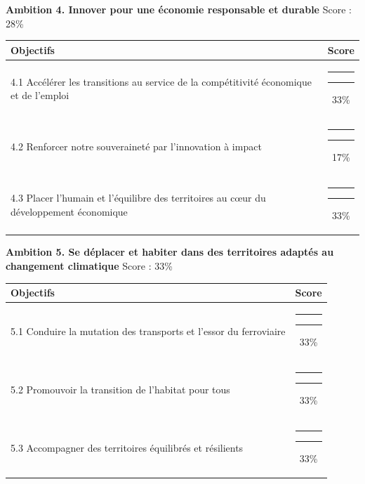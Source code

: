 \documentclass[
]{article}
\begin{document}
\needspace{8cm}
\vspace{0.8cm}

\textbf{\fontsize{10pt}{12pt}\selectfont Ambition 4. Innover pour une économie responsable et durable}
\hfill \small Score : 28\%

\begin{center}
\begin{tabular}{p{10cm}c}
\toprule
Objectifs & Score \\
\midrule
4.1 Accélérer les transitions au service de la compétitivité économique et de l’emploi & {\color[HTML]{EB6E26}\rule{1.98cm}{3pt}}{\color{gray}\rule{4.02cm}{3pt}}\hspace{0.3cm}33\% \\
4.2 Renforcer notre souveraineté par l’innovation à impact & {\color[HTML]{CC1414}\rule{1.02cm}{3pt}}{\color{gray}\rule{4.98cm}{3pt}}\hspace{0.3cm}17\% \\
4.3 Placer l’humain et l’équilibre des territoires au cœur du développement économique & {\color[HTML]{EB6E26}\rule{1.98cm}{3pt}}{\color{gray}\rule{4.02cm}{3pt}}\hspace{0.3cm}33\% \\
\bottomrule
\end{tabular}
\end{center}

\needspace{8cm}
\vspace{0.8cm}

\textbf{\fontsize{10pt}{12pt}\selectfont Ambition 5. Se déplacer et habiter dans des territoires adaptés au changement climatique}
\hfill \small Score : 33\%

\begin{center}
\begin{tabular}{p{10cm}c}
\toprule
Objectifs & Score \\
\midrule
5.1 Conduire la mutation des transports et l’essor du ferroviaire & {\color[HTML]{EB6E26}\rule{1.98cm}{3pt}}{\color{gray}\rule{4.02cm}{3pt}}\hspace{0.3cm}33\% \\
5.2 Promouvoir la transition de l’habitat pour tous & {\color[HTML]{EB6E26}\rule{1.98cm}{3pt}}{\color{gray}\rule{4.02cm}{3pt}}\hspace{0.3cm}33\% \\
5.3 Accompagner des territoires équilibrés et résilients & {\color[HTML]{EB6E26}\rule{1.98cm}{3pt}}{\color{gray}\rule{4.02cm}{3pt}}\hspace{0.3cm}33\% \\
\bottomrule
\end{tabular}
\end{center}
\end{document}
